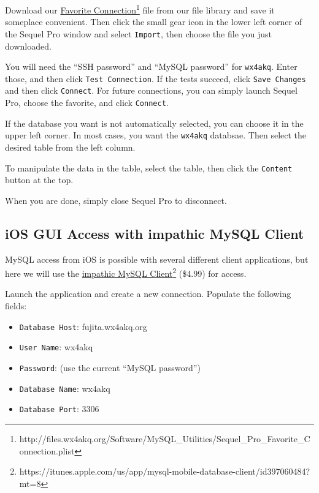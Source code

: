 \documentclass[pdflatex,letterpaper,twoside,12pt]{book}
\begin{document}
Download our \href{http://files.wx4akq.org/Software/MySQL\_Utilities/Sequel\_Pro\_Favorite\_Connection.plist}{Favorite Connection}\footnote{http://files.wx4akq.org/Software/MySQL\_Utilities/Sequel\_Pro\_Favorite\_Connection.plist} file from our file library and save it someplace convenient.  Then click the small gear icon in the lower left corner of the Sequel Pro window and select \texttt{Import}, then choose the file you just downloaded.

You will need the ``SSH password'' and ``MySQL password'' for \texttt{wx4akq}.  Enter those, and then click \texttt{Test Connection}.  If the tests succeed, click \texttt{Save Changes} and then click \texttt{Connect}.  For future connections, you can simply launch Sequel Pro, choose the favorite, and click \texttt{Connect}.

If the database you want is not automatically selected, you can choose it in the upper left corner.  In most cases, you want the \texttt{wx4akq} databsae.  Then select the desired table from the left column.

To manipulate the data in the table, select the table, then click the \texttt{Content} button at the top.

When you are done, simply close Sequel Pro to disconnect.

\subsection{iOS GUI Access with impathic MySQL Client}

MySQL access from iOS is possible with several different client applications, but here we will use the \href{https://itunes.apple.com/us/app/mysql-mobile-database-client/id397060484?mt=8}{impathic MySQL Client}\footnote{https://itunes.apple.com/us/app/mysql-mobile-database-client/id397060484?mt=8} (\$4.99) for access.

Launch the application and create a new connection.  Populate the following fields:

\begin{itemize}
\item \texttt{Database Host}: fujita.wx4akq.org
\item \texttt{User Name}: wx4akq
\item \texttt{Password}: (use the current ``MySQL password'')
\item \texttt{Database Name}: wx4akq
\item \texttt{Database Port}: 3306
\end{itemize}
\end{document}
